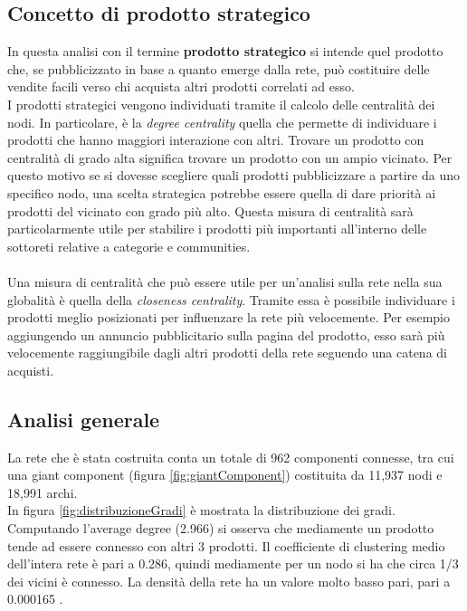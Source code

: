 \subsection{Concetto di prodotto strategico}
In questa analisi con il termine \textbf{prodotto strategico} si intende quel prodotto che, se pubblicizzato in base a quanto emerge dalla rete, può costituire delle vendite facili verso chi acquista altri prodotti correlati ad esso. \\
I prodotti strategici vengono individuati tramite il calcolo delle centralità dei nodi. In particolare, è la \textit{degree centrality} quella che permette di individuare i prodotti che hanno maggiori interazione con altri. Trovare un prodotto con centralità di grado alta significa trovare un prodotto con un ampio vicinato. Per questo motivo se si dovesse scegliere quali prodotti pubblicizzare a partire da uno specifico nodo, una scelta strategica potrebbe essere quella di dare priorità ai prodotti del vicinato con grado più alto. Questa misura di centralità sarà particolarmente utile per stabilire i prodotti più importanti all'interno delle sottoreti relative a categorie e communities. \\\\
Una misura di centralità che può essere utile per un'analisi sulla rete nella sua globalità è quella della \textit{closeness centrality}. Tramite essa è possibile individuare i prodotti meglio posizionati per influenzare la rete più velocemente. Per esempio aggiungendo un annuncio pubblicitario sulla pagina del prodotto, esso sarà più velocemente raggiungibile dagli altri prodotti della rete seguendo una catena di acquisti.
   

\subsection{Analisi generale}
La rete che è stata costruita conta un totale di 962 componenti connesse, tra cui una giant component (figura \ref{fig:giantComponent}) costituita da 11,937 nodi e 18,991 archi. \\
In figura \ref{fig:distribuzioneGradi} è mostrata la distribuzione dei gradi. Computando l'average degree (2.966) si osserva che mediamente un prodotto tende ad essere connesso con altri 3 prodotti. Il coefficiente di clustering medio dell'intera rete è pari a 0.286, quindi mediamente per un nodo si ha che circa 1/3 dei vicini è connesso. La densità della rete ha un valore molto basso pari, pari a 0.000165 . \\\\

